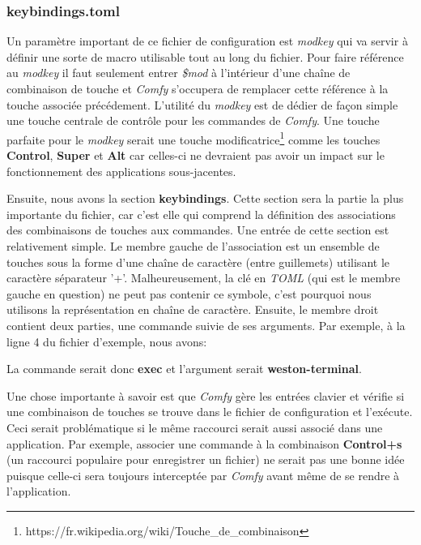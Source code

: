 \documentclass[titlepage]{article}
\begin{document}
\subsubsection{keybindings.toml}
\begin{minipage}{\linewidth}
	
\end{minipage}

\par
Un paramètre important de ce fichier de configuration est \textit{modkey} qui va servir à définir une sorte de macro utilisable tout au long du fichier. Pour faire référence au \textit{modkey} il faut seulement entrer \textit{\$mod} à l'intérieur d'une chaîne de combinaison de touche et \textit{Comfy} s'occupera de remplacer cette référence à la touche associée précédement. L'utilité du \textit{modkey} est de dédier de façon simple une touche centrale de contrôle pour les commandes de \textit{Comfy}. Une touche parfaite pour le \textit{modkey} serait une touche modificatrice\footnote{https://fr.wikipedia.org/wiki/Touche\_de\_combinaison} comme les touches \textbf{Control}, \textbf{Super} et \textbf{Alt} car celles-ci ne devraient pas avoir un impact sur le fonctionnement des applications sous-jacentes.
\par
\bigskip
Ensuite, nous avons la section \textbf{keybindings}. Cette section sera la partie la plus importante du fichier, car c'est elle qui comprend la définition des associations des combinaisons de touches aux commandes. Une entrée de cette section est relativement simple. Le membre gauche de l'association est un ensemble de touches sous la forme d'une chaîne de caractère (entre guillemets) utilisant le caractère séparateur '+'. Malheureusement, la clé en \textit{TOML} (qui est le membre gauche en question) ne peut pas contenir ce symbole, c'est pourquoi nous utilisons la représentation en chaîne de caractère. Ensuite, le membre droit contient deux parties, une commande suivie de ses arguments. Par exemple, à la ligne 4 du fichier d'exemple, nous avons:



La commande serait donc \textbf{exec} et l'argument serait \textbf{weston-terminal}.

\par
\bigskip
Une chose importante à savoir est que \textit{Comfy} gère les entrées clavier et vérifie si une combinaison de touches se trouve dans le fichier de configuration et l'exécute. Ceci serait problématique si le même raccourci serait aussi associé dans une application. Par exemple, associer une commande à la combinaison \textbf{Control+s} (un raccourci populaire pour enregistrer un fichier) ne serait pas une bonne idée puisque celle-ci sera toujours interceptée par \textit{Comfy} avant même de se rendre à l'application.
\end{document}
